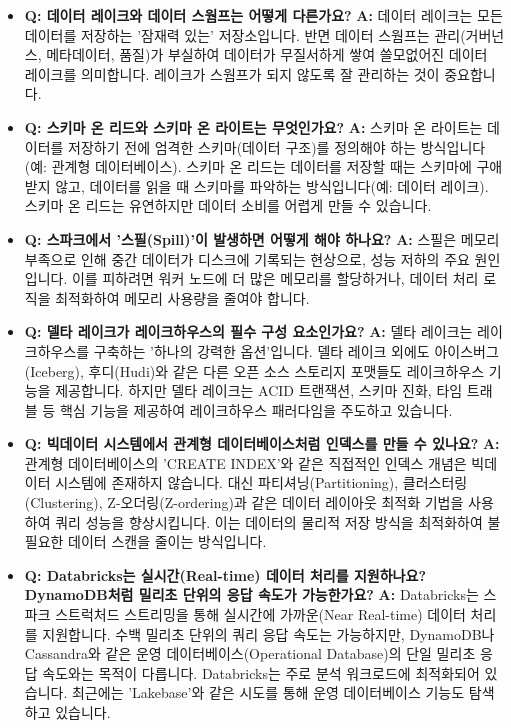 \documentclass[11pt,a4paper]{article}
\begin{document}
\begin{tcolorbox}[title=\textbf{초심자를 위한 FAQ}, colback=yellow!5!white, colframe=yellow!75!black, sharp corners, boxrule=0.8pt]
\begin{itemize}
    \item \textbf{Q: 데이터 레이크와 데이터 스웜프는 어떻게 다른가요?}
    \textbf{A:} 데이터 레이크는 모든 데이터를 저장하는 '잠재력 있는' 저장소입니다. 반면 데이터 스웜프는 관리(거버넌스, 메타데이터, 품질)가 부실하여 데이터가 무질서하게 쌓여 쓸모없어진 데이터 레이크를 의미합니다. 레이크가 스웜프가 되지 않도록 잘 관리하는 것이 중요합니다.

    \item \textbf{Q: 스키마 온 리드와 스키마 온 라이트는 무엇인가요?}
    \textbf{A:} 스키마 온 라이트는 데이터를 저장하기 전에 엄격한 스키마(데이터 구조)를 정의해야 하는 방식입니다(예: 관계형 데이터베이스). 스키마 온 리드는 데이터를 저장할 때는 스키마에 구애받지 않고, 데이터를 읽을 때 스키마를 파악하는 방식입니다(예: 데이터 레이크). 스키마 온 리드는 유연하지만 데이터 소비를 어렵게 만들 수 있습니다.

    \item \textbf{Q: 스파크에서 '스필(Spill)'이 발생하면 어떻게 해야 하나요?}
    \textbf{A:} 스필은 메모리 부족으로 인해 중간 데이터가 디스크에 기록되는 현상으로, 성능 저하의 주요 원인입니다. 이를 피하려면 워커 노드에 더 많은 메모리를 할당하거나, 데이터 처리 로직을 최적화하여 메모리 사용량을 줄여야 합니다.

    \item \textbf{Q: 델타 레이크가 레이크하우스의 필수 구성 요소인가요?}
    \textbf{A:} 델타 레이크는 레이크하우스를 구축하는 '하나의 강력한 옵션'입니다. 델타 레이크 외에도 아이스버그(Iceberg), 후디(Hudi)와 같은 다른 오픈 소스 스토리지 포맷들도 레이크하우스 기능을 제공합니다. 하지만 델타 레이크는 ACID 트랜잭션, 스키마 진화, 타임 트래블 등 핵심 기능을 제공하여 레이크하우스 패러다임을 주도하고 있습니다.

    \item \textbf{Q: 빅데이터 시스템에서 관계형 데이터베이스처럼 인덱스를 만들 수 있나요?}
    \textbf{A:} 관계형 데이터베이스의 'CREATE INDEX'와 같은 직접적인 인덱스 개념은 빅데이터 시스템에 존재하지 않습니다. 대신 파티셔닝(Partitioning), 클러스터링(Clustering), Z-오더링(Z-ordering)과 같은 데이터 레이아웃 최적화 기법을 사용하여 쿼리 성능을 향상시킵니다. 이는 데이터의 물리적 저장 방식을 최적화하여 불필요한 데이터 스캔을 줄이는 방식입니다.

    \item \textbf{Q: Databricks는 실시간(Real-time) 데이터 처리를 지원하나요? DynamoDB처럼 밀리초 단위의 응답 속도가 가능한가요?}
    \textbf{A:} Databricks는 스파크 스트럭처드 스트리밍을 통해 실시간에 가까운(Near Real-time) 데이터 처리를 지원합니다. 수백 밀리초 단위의 쿼리 응답 속도는 가능하지만, DynamoDB나 Cassandra와 같은 운영 데이터베이스(Operational Database)의 단일 밀리초 응답 속도와는 목적이 다릅니다. Databricks는 주로 분석 워크로드에 최적화되어 있습니다. 최근에는 'Lakebase'와 같은 시도를 통해 운영 데이터베이스 기능도 탐색하고 있습니다.


\end{itemize}
\end{tcolorbox}
\end{document}
